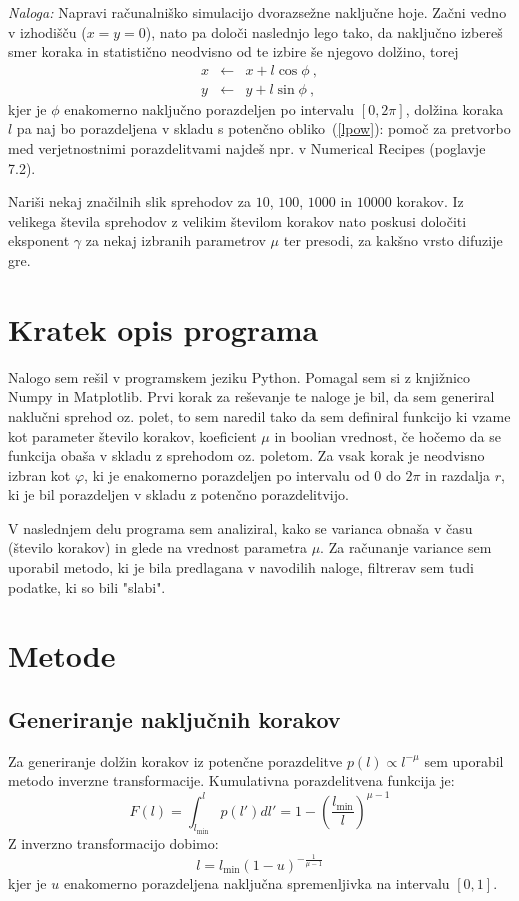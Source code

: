 \documentclass{article}
\begin{document}
\bigskip

{\sl Naloga:} Napravi računalniško simulacijo
dvorazsežne naključne hoje.  Začni vedno v izhodišču
($x=y=0$), nato pa določi naslednjo lego tako, da naključno
izbereš smer koraka in statistično neodvisno od te izbire
še njegovo dolžino, torej
\begin{eqnarray*}
x &\leftarrow& x + l \cos\phi \>, \\
y &\leftarrow& y + l \sin\phi \>,
\end{eqnarray*}
kjer je $\phi$ enakomerno naključno porazdeljen po intervalu
$[0,2\pi]$, dolžina koraka $l$ pa naj bo porazdeljena
v skladu s potenčno obliko~(\ref{lpow}): pomoč za pretvorbo
med verjetnostnimi porazdelitvami najdeš npr. v Numerical
Recipes (poglavje 7.2). 

Nariši nekaj značilnih slik sprehodov za $10$, $100$, $1000$ in $10000$ korakov.
Iz velikega števila sprehodov z velikim številom korakov
nato poskusi določiti eksponent $\gamma$ za nekaj izbranih
parametrov $\mu$ ter presodi, za kakšno vrsto difuzije gre.

\section{Kratek opis programa}
Nalogo sem rešil v programskem jeziku Python. Pomagal sem si z knjižnico Numpy in Matplotlib.
Prvi korak za reševanje te naloge je bil, da sem generiral naklučni sprehod oz. polet, to sem naredil tako da
sem definiral funkcijo ki vzame kot parameter število korakov, koeficient $\mu$ in boolian vrednost, če hočemo
da se funkcija obaša v skladu z sprehodom oz. poletom. Za vsak korak je neodvisno izbran kot $\varphi$, ki je 
enakomerno porazdeljen po intervalu od $0$ do $2\pi$ in razdalja $r$, ki je bil porazdeljen v skladu z potenčno
porazdelitvijo.

V naslednjem delu programa sem analiziral, kako se varianca obnaša v času (število korakov) in glede na vrednost
parametra $\mu$. Za računanje variance sem uporabil metodo, ki je bila predlagana v navodilih naloge, filtrerav 
sem tudi podatke, ki so bili "slabi". 

\section{Metode}

\subsection{Generiranje naključnih korakov}
Za generiranje dolžin korakov iz potenčne porazdelitve $p(l) \propto l^{-\mu}$ sem uporabil metodo inverzne transformacije. Kumulativna porazdelitvena funkcija je:
\begin{equation}
F(l) = \int_{l_{\text{min}}}^l p(l') dl' = 1 - \left(\frac{l_{\text{min}}}{l}\right)^{\mu-1}
\end{equation}
Z inverzno transformacijo dobimo:
\begin{equation}
l = l_{\text{min}} (1 - u)^{-\frac{1}{\mu-1}}
\end{equation}
kjer je $u$ enakomerno porazdeljena naključna spremenljivka na intervalu $[0,1]$.
\end{document}
